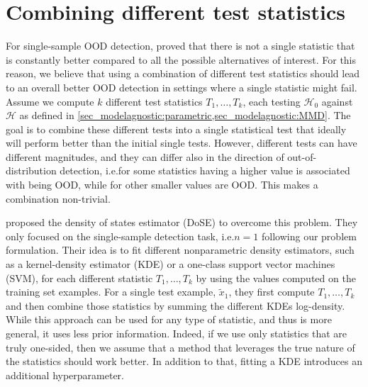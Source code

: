 {%

\section{Combining different test statistics}
\label{sec_modelagnostic:combination_p_values}
For single-sample OOD detection, \textcite{zhang_understanding_2021} proved that there is not a single statistic that is constantly better compared to all the possible alternatives of interest. For this reason, we believe that using a combination of different test statistics should lead to an overall better OOD detection in settings where a single statistic might fail. Assume we compute $k$ different test statistics $T_1,\dots, T_k$, each testing $\mathcal{H}_0$ against $\mathcal{H}$ as defined in \cref{sec_modelagnostic:parametric,sec_modelagnostic:MMD}. The goal is to combine these different tests into a single statistical test that ideally will perform better than the initial single tests. However, different tests can have different magnitudes, and they can differ also in the direction of out-of-distribution detection, i.e.\@ for some statistics having a higher value is associated with being OOD, while for other smaller values are OOD. This makes a combination non-trivial.

\textcite{morningstar_density_2021} proposed the density of states estimator (DoSE) to overcome this problem. They only focused on the single-sample detection task, i.e.\@ $n=1$ following our problem formulation. Their idea is to fit different nonparametric density estimators, such as a kernel-density estimator (KDE) or a one-class support vector machines (SVM), for each different statistic $T_1,\dots, T_k$ by using the values computed on the training set examples. For a single test example, $\tilde{x}_1$, they first compute $T_1,\dots, T_k$ and then combine those statistics by summing the different KDEs log-density. %
While this approach can be used for any type of statistic, and thus is more general, it uses less prior information. Indeed, if we use only statistics that are truly one-sided, then we assume that a method that leverages the true nature of the statistics should work better. In addition to that, fitting a KDE introduces an additional hyperparameter.

}
